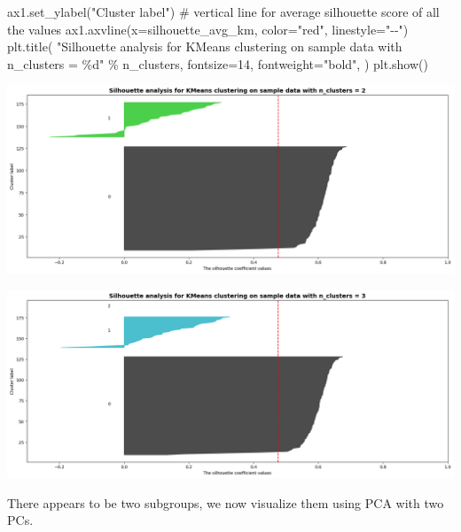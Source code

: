 \documentclass[
  11pt,
  letterpaper,
  DIV=11,
  numbers=noendperiod]{scrartcl}
\newenvironment{Shaded}{\begin{snugshade}}{\end{snugshade}}
\newcommand{\CommentTok}[1]{\textcolor[rgb]{0.37,0.37,0.37}{#1}}
\newcommand{\DecValTok}[1]{\textcolor[rgb]{0.68,0.00,0.00}{#1}}
\newcommand{\NormalTok}[1]{\textcolor[rgb]{0.00,0.23,0.31}{#1}}
\newcommand{\OperatorTok}[1]{\textcolor[rgb]{0.37,0.37,0.37}{#1}}
\newcommand{\SpecialCharTok}[1]{\textcolor[rgb]{0.37,0.37,0.37}{#1}}
\newcommand{\StringTok}[1]{\textcolor[rgb]{0.13,0.47,0.30}{#1}}
\begin{document}
\begin{Shaded}
\begin{Highlighting}[]
\NormalTok{    ax1.set\_ylabel(}\StringTok{"Cluster label"}\NormalTok{)}
    \CommentTok{\# vertical line for average silhouette score of all the values}
\NormalTok{    ax1.axvline(x}\OperatorTok{=}\NormalTok{silhouette\_avg\_km, color}\OperatorTok{=}\StringTok{"red"}\NormalTok{, linestyle}\OperatorTok{=}\StringTok{"{-}{-}"}\NormalTok{)}
\NormalTok{    plt.title(}
        \StringTok{"Silhouette analysis for KMeans clustering on sample data with n\_clusters = }\SpecialCharTok{\%d}\StringTok{"}
        \OperatorTok{\%}\NormalTok{ n\_clusters,}
\NormalTok{        fontsize}\OperatorTok{=}\DecValTok{14}\NormalTok{,}
\NormalTok{        fontweight}\OperatorTok{=}\StringTok{"bold"}\NormalTok{,}
\NormalTok{    )}
\NormalTok{plt.show()}
\end{Highlighting}
\end{Shaded}

\includegraphics{Seebach_Lily_HW6_files/figure-pdf/cell-14-output-1.png}

\includegraphics{Seebach_Lily_HW6_files/figure-pdf/cell-14-output-2.png}

There appears to be two subgroups, we now visualize them using PCA with
two PCs.
\end{document}
